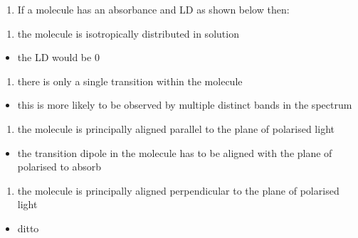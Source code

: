 \documentclass[
]{book}
\providecommand{\tightlist}{%
  \setlength{\itemsep}{0pt}\setlength{\parskip}{0pt}}
\begin{document}
\begin{enumerate}
\def\labelenumi{\arabic{enumi}.}
\setcounter{enumi}{3}
\tightlist
\item
  If a molecule has an absorbance and LD as shown below then:
\end{enumerate}

\begin{enumerate}
\def\labelenumi{\alph{enumi}.}
\tightlist
\item
  the molecule is isotropically distributed in solution
\end{enumerate}

\begin{itemize}
\tightlist
\item
  the LD would be 0
\end{itemize}

\begin{enumerate}
\def\labelenumi{\alph{enumi}.}
\setcounter{enumi}{1}
\tightlist
\item
  there is only a single transition within the molecule
\end{enumerate}

\begin{itemize}
\tightlist
\item
  this is more likely to be observed by multiple distinct bands in the spectrum
\end{itemize}

\begin{enumerate}
\def\labelenumi{\alph{enumi}.}
\setcounter{enumi}{2}
\tightlist
\item
  the molecule is principally aligned parallel to the plane of polarised light
\end{enumerate}

\begin{itemize}
\tightlist
\item
  the transition dipole in the molecule has to be aligned with the plane of polarised to absorb
\end{itemize}

\begin{enumerate}
\def\labelenumi{\alph{enumi}.}
\setcounter{enumi}{3}
\tightlist
\item
  the molecule is principally aligned perpendicular to the plane of polarised light
\end{enumerate}

\begin{itemize}
\tightlist
\item
  ditto
\end{itemize}
\end{document}
